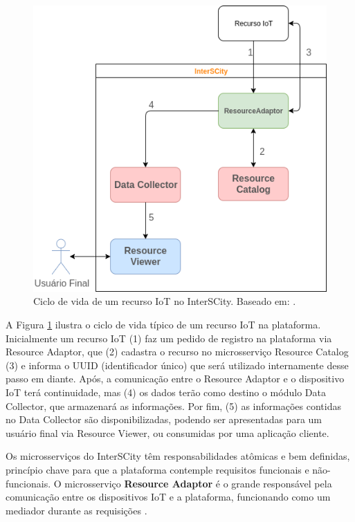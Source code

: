 \begin{figure}
  \centering
    \includegraphics[scale=0.5]{figuras/interscity_flow.png}
  \caption{Ciclo de vida de um recurso IoT no InterSCity. Baseado em: .}

  \label{fig:interscity-lifecycle}
\end{figure}

A Figura \ref{fig:interscity-lifecycle} ilustra o ciclo de vida típico de um
recurso IoT na plataforma. Inicialmente um recurso IoT (1) faz um pedido de
registro na plataforma via Resource Adaptor, que (2) cadastra o recurso no
microsserviço Resource Catalog (3) e informa o UUID
(identificador único) que será utilizado internamente desse passo em diante.
Após, a comunicação entre o Resource Adaptor e o dispositivo IoT terá
continuidade, mas (4) os dados terão como destino o módulo Data Collector,
que armazenará as informações. Por fim, (5) as informações contidas no
Data Collector são disponibilizadas, podendo ser apresentadas para um usuário
final via Resource Viewer, ou consumidas por uma aplicação cliente.

Os microsserviços do InterSCity têm responsabilidades atômicas e bem
definidas, princípio chave para que a plataforma contemple requisitos funcionais
e não-funcionais. O microsserviço \textbf{Resource Adaptor} é o grande
responsável pela comunicação entre os dispositivos IoT e a plataforma,
funcionando como um mediador durante as requisições \cite{delesposte2017}.

